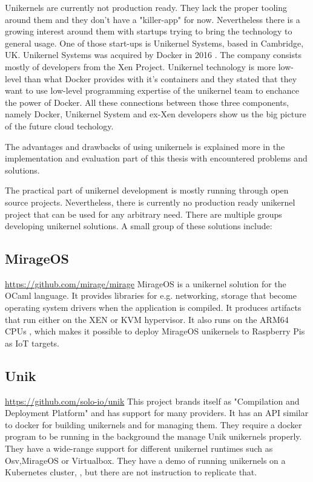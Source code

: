 Unikernels are currently not production ready. \cite{unfit-for-production} They lack the proper tooling around them and they don't have a "killer-app" for now. Nevertheless there is a growing interest around them with startups trying to bring the technology to general usage. One of those start-ups is Unikernel Systems, based in Cambridge, UK. Unikernel Systems was acquired by Docker in 2016 \cite{docker-acquisiton}. The company consists mostly of developers from the Xen Project. Unikernel technology is more low-level than what Docker provides with it's containers and they stated that they want to use low-level programming expertise of the unikernel team to enchance the power of Docker. All these connections between those three components, namely Docker, Unikernel System and ex-Xen developers show us the big picture of the future cloud techology.

The advantages and drawbacks of using unikernels is explained more in the implementation and evaluation part of this thesis with encountered problems and solutions.

 
The practical part of unikernel development is mostly running through open source projects. Nevertheless, there is currently no production ready unikernel project that can be used for any arbitrary need. There are multiple groups developing unikernel solutions. A small group of these solutions include: 
\subsection*{MirageOS}

\url{https://github.com/mirage/mirage} \cite{madhavapeddy2014unikernels}
  MirageOS is a unikernel solution for the OCaml language. It provides libraries for e.g. networking, storage that become operating system drivers when the application is compiled. It produces artifacts that run either on the XEN or KVM hypervisor. It also runs on the ARM64 CPUs , which makes it possible to deploy MirageOS unikernels to Raspberry Pis as IoT targets. 
\subsection*{Unik}
\url{https://github.com/solo-io/unik}\cite{levine2016unik} This project brands itself as "Compilation and Deployment Platform" and has support for many providers. It has an API similar to docker for building unikernels and for managing them. They require a docker program to be running in the background the manage Unik unikernels properly. They have a wide-range support for different unikernel runtimes such as Osv,MirageOS or Virtualbox. They have a demo of running unikernels on a Kubernetes cluster, \cite{unik-youtube}, but there are not instruction to replicate that.
